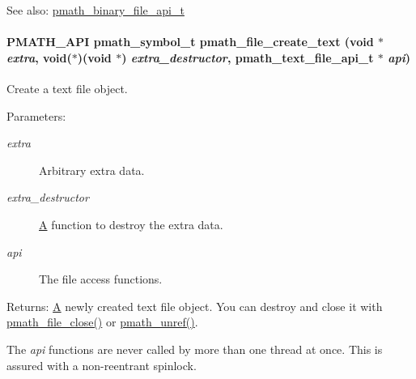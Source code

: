 \begin{Desc}
\item[See also:]\hyperlink{structpmath__binary__file__api__t}{pmath\_\-binary\_\-file\_\-api\_\-t} \end{Desc}
\hypertarget{group__file__api_gb8a4394b083543a3e572862d567b4b63}{
\paragraph[{pmath\_\-file\_\-create\_\-text}]{\setlength{\rightskip}{0pt plus 5cm}PMATH\_\-API {\bf pmath\_\-symbol\_\-t} pmath\_\-file\_\-create\_\-text (void $\ast$ {\em extra}, \/  void($\ast$)(void $\ast$) {\em extra\_\-destructor}, \/  {\bf pmath\_\-text\_\-file\_\-api\_\-t} $\ast$ {\em api})}\hfill}
\label{group__file__api_gb8a4394b083543a3e572862d567b4b63}


Create a text file object. 

\begin{Desc}
\item[Parameters:]
\begin{description}
\item[{\em extra}]Arbitrary extra data. \item[{\em extra\_\-destructor}]\hyperlink{class_a}{A} function to destroy the extra data. \item[{\em api}]The file access functions. \end{description}
\end{Desc}
\begin{Desc}
\item[Returns:]\hyperlink{class_a}{A} newly created text file object. You can destroy and close it with \hyperlink{group__file__api_g61142920bd7a8f066af908092c84d8e4}{pmath\_\-file\_\-close()} or \hyperlink{classpmath__t_54e905402c38940687033b87eb8c6c9f}{pmath\_\-unref()}.\end{Desc}
The {\em api\/} functions are never called by more than one thread at once. This is assured with a non-reentrant spinlock.

